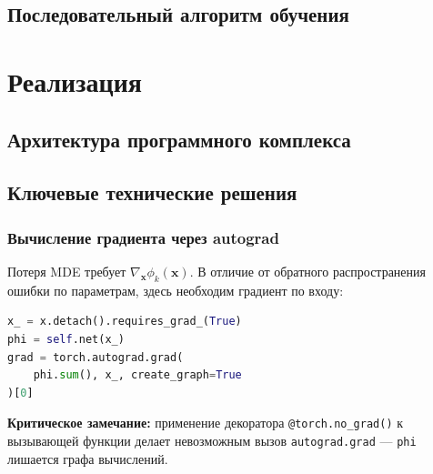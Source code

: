 \documentclass[14pt, a4paper, oneside]{extreport}
\theoremstyle{plain}
\theoremstyle{definition}
\begin{document}

\section{Последовательный алгоритм обучения}


\chapter{Реализация}
\label{ch:impl}

\section{Архитектура программного комплекса}


\section{Ключевые технические решения}

\subsection{Вычисление градиента через autograd}

Потеря MDE требует $\nabla_\mathbf{x} \phi_k(\mathbf{x})$.
В отличие от обратного распространения ошибки по параметрам, здесь необходим градиент по входу:

\begin{lstlisting}[language=Python]
x_ = x.detach().requires_grad_(True)
phi = self.net(x_)
grad = torch.autograd.grad(
    phi.sum(), x_, create_graph=True
)[0]
\end{lstlisting}

\textbf{Критическое замечание:} применение декоратора \texttt{@torch.no\_grad()} к вызывающей функции делает невозможным вызов \texttt{autograd.grad} — \texttt{phi} лишается графа вычислений.

\end{document}
